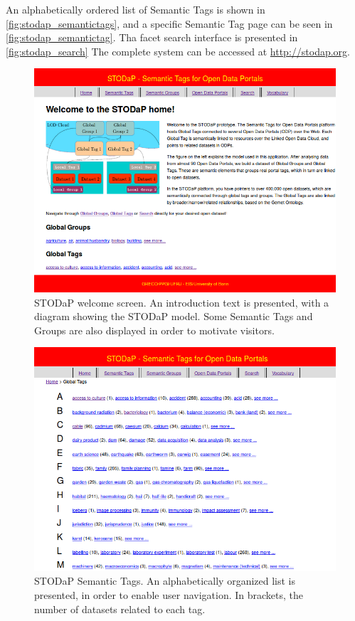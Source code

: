 An alphabetically ordered list of Semantic Tags is shown in \autoref{fig:stodap_semantictags}, and a specific Semantic Tag page can be seen in \autoref{fig:stodap_semantictag}.
Tha facet search interface is presented in \autoref{fig:stodap_search}
The complete system can be accessed at \url{http://stodap.org}.

\begin{figure}[h]
\begin{center}
\includegraphics[width=\columnwidth]{images/stodapscreen_welcome.png}
\caption[STODaP welcome screen.]{STODaP welcome screen. An introduction text is presented, with a diagram showing the STODaP model. Some Semantic Tags and Groups are also displayed in order to motivate visitors.}
\label{fig:stodap_welcome}
\end{center}
\end{figure}

\begin{figure}[h]
\begin{center}
\includegraphics[width=\columnwidth]{images/stodapscreen_semantictags.png}
\caption[STODaP Semantic Tags.]{STODaP Semantic Tags. An alphabetically organized list is presented, in order to enable user navigation. In brackets, the number of datasets related to each tag.}
\label{fig:stodap_semantictags}
\end{center}
\end{figure}

